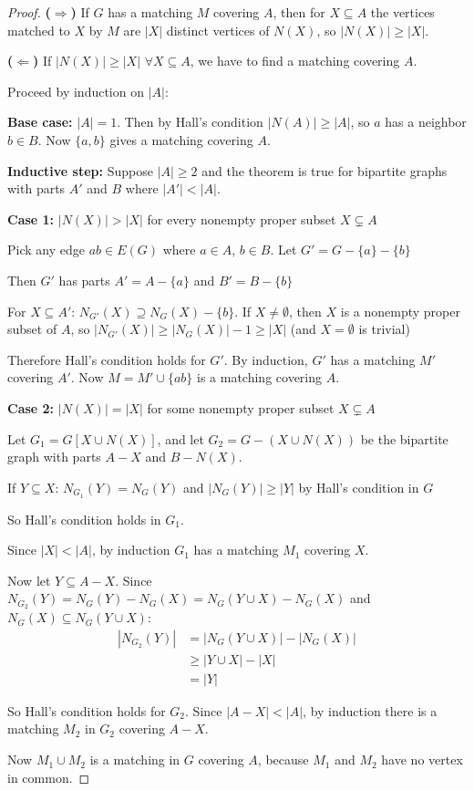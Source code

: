 \documentclass{article}
\theoremstyle{definition}
\begin{document}
\begin{proof}
\textbf{($\Rightarrow$)} If $G$ has a matching $M$ covering $A$, then for $X \subseteq A$ the vertices matched to $X$ by $M$ are $|X|$ distinct vertices of $N(X)$, so $|N(X)| \geq |X|$.

\textbf{($\Leftarrow$)} If $|N(X)| \geq |X|$ $\forall X \subseteq A$, we have to find a matching covering $A$.

Proceed by induction on $|A|$:

\textbf{Base case:} $|A| = 1$. Then by Hall's condition $|N(A)| \geq |A|$, so $a$ has a neighbor $b \in B$. Now $\{a,b\}$ gives a matching covering $A$.

\textbf{Inductive step:} Suppose $|A| \geq 2$ and the theorem is true for bipartite graphs with parts $A'$ and $B$ where $|A'| < |A|$.

\textbf{Case 1:} $|N(X)| > |X|$ for every nonempty proper subset $X \subsetneq A$

Pick any edge $ab \in E(G)$ where $a \in A$, $b \in B$.
Let $G' = G - \{a\} - \{b\}$

Then $G'$ has parts $A' = A - \{a\}$ and $B' = B - \{b\}$

For $X \subseteq A'$: $N_{G'}(X) \supseteq N_G(X) - \{b\}$.
If $X \neq \emptyset$, then $X$ is a nonempty proper subset of $A$, so
$|N_{G'}(X)| \geq |N_G(X)| - 1 \geq |X|$ (and $X = \emptyset$ is trivial)

Therefore Hall's condition holds for $G'$.
By induction, $G'$ has a matching $M'$ covering $A'$.
Now $M = M' \cup \{ab\}$ is a matching covering $A$.

\textbf{Case 2:} $|N(X)| = |X|$ for some nonempty proper subset $X \subsetneq A$

Let $G_1 = G[X\cup N(X)]$, and let $G_2 = G - (X \cup N(X))$ be the bipartite graph with parts $A - X$ and $B - N(X)$.

If $Y \subseteq X$: $N_{G_1}(Y) = N_G(Y)$ and
$|N_G(Y)| \geq |Y|$ by Hall's condition in $G$

So Hall's condition holds in $G_1$.

Since $|X| < |A|$, by induction $G_1$ has a matching $M_1$ covering $X$.

Now let $Y \subseteq A-X$. Since $N_{G_2}(Y) = N_G(Y) - N_G(X) = N_G(Y\cup X) - N_G(X)$ and $N_G(X) \subseteq N_G(Y \cup X)$:
\begin{align*}
|N_{G_2}(Y)| &= |N_G(Y\cup X)| - |N_G(X)| \\
&\geq |Y\cup X| - |X| \\
&= |Y|
\end{align*}

So Hall's condition holds for $G_2$. Since $|A - X| < |A|$, by induction there is a matching $M_2$ in $G_2$ covering $A-X$.

Now $M_1\cup M_2$ is a matching in $G$ covering $A$, because $M_1$ and $M_2$ have no vertex in common.
\end{proof}
\end{document}

